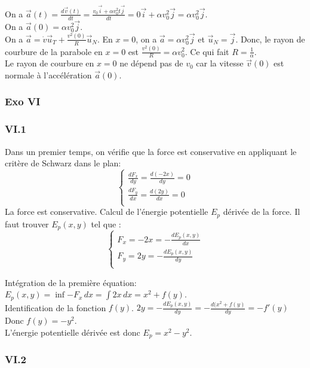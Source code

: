 \documentclass[]{book}
\theoremstyle{definition}
\begin{document}
On a $\vec{a}(t) = \frac{d\vec{v}(t)}{dt} = \frac{v_0\vec{i}+\alpha v_0^2 t \vec{j}}{dt} = 0\vec{i}+\alpha v_0^2\vec{j} = \alpha v_0^2\vec{j}$. \\

On a $\vec{a}(0) = \alpha v_0^2 \vec{j}$.\\

On a $\vec{a} = \dot{v}\vec{u}_T + \frac{v^2(0)}{R}\vec{u}_N$. En $x=0$, on a $\vec{a} = \alpha v_0^2 \vec{j}$ et $\vec{u}_N = \vec{j}$. Donc, le rayon de courbure de la parabole en $x = 0$ est $\frac{v^2(0)}{R} = \alpha v_0^2$. Ce qui fait $R=\frac{1}{\alpha}$. \\

Le rayon de courbure en $x=0$ ne d\'epend pas de $v_0$ car la vitesse $\vec{v}(0)$ est normale \`a l'acc\'el\'eration $\vec{a}(0)$.

\subsubsection*{Exo VI}
\subsubsection*{VI.1}

Dans un premier temps, on v\'erifie que la force est conservative en appliquant le crit\`ere de Schwarz dans le plan:
$$
\left\{
\begin{array}{l }
	\frac{dF_x}{dy} = \frac{d(-2x)}{dy} = 0\\
	\frac{dF_y}{dx} = \frac{d(2y)}{dx} = 0\\
\end{array}
\right. 
$$
La force est conservative. Calcul de l'\'energie potentielle $E_p$ d\'eriv\'ee de la force. Il faut trouver $E_p(x,y)$ tel que :
$$
\left\{
\begin{array}{l }
	F_x = -2x = -\frac{dE_p(x,y)}{dx} \\
	F_y =  2y = -\frac{dE_p(x,y)}{dy} \\
\end{array}
\right. 
$$

Int\'egration de la premi\`ere \'equation: $E_p(x,y) = \inf{-F_x\, dx} = \int{2x\, dx} = x^2 + f(y)$.\\
Identification de la fonction $f(y)$. $2y = -\frac{dE_p(x,y)}{dy} = -\frac{d(x^2+f(y)}{dy} = -f'(y)$ Donc $f(y) = -y^2$.\\

L'\'energie potentielle d\'eriv\'ee est donc $E_p = x^2 - y^2$.


\subsubsection*{VI.2}
\end{document}
